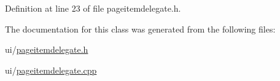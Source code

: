 Definition at line 23 of file pageitemdelegate.\+h.



The documentation for this class was generated from the following files\+:\begin{DoxyCompactItemize}
\item 
ui/\hyperlink{pageitemdelegate_8h}{pageitemdelegate.\+h}\item 
ui/\hyperlink{pageitemdelegate_8cpp}{pageitemdelegate.\+cpp}\end{DoxyCompactItemize}
